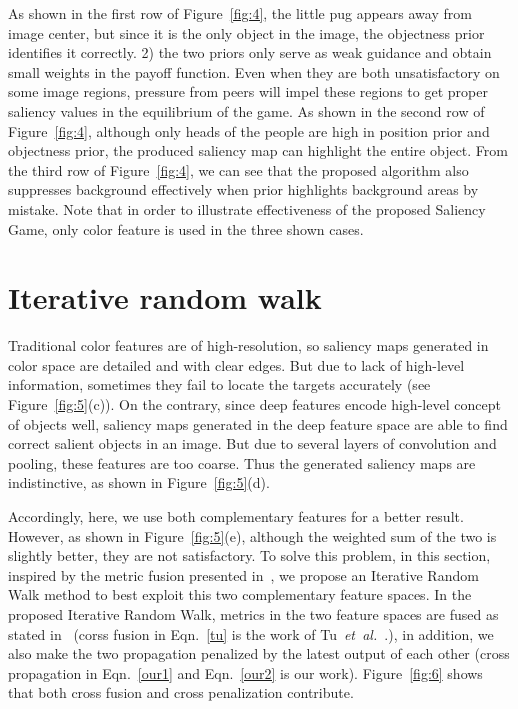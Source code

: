 \documentclass[journal]{IEEEtran}
\newcommand{\etal}{\mbox{\emph{et al.\ }}}
\begin{document}
As shown in the first row of Figure~\ref{fig:4}, the little pug appears away from image center, but since it is the only object in the image, the objectness prior identifies it correctly. 2) the two priors only serve as weak guidance and obtain small weights in the payoff function. Even when they are both unsatisfactory on some image regions, pressure from peers will impel these regions to get proper saliency values in the equilibrium of the game. As shown in the second row of Figure~\ref{fig:4}, although only heads of the people are high in position prior and objectness prior, the produced saliency map can highlight the entire object. From the third row of Figure~\ref{fig:4}, we can see that the proposed algorithm also suppresses background effectively when prior highlights background areas by mistake. Note that in order to illustrate effectiveness of the proposed Saliency Game, only color feature is used in the three shown cases.

\section{Iterative random walk}
Traditional color features are of high-resolution, so saliency maps generated in color space are detailed and with clear edges. But due to lack of high-level information, sometimes they fail to locate the targets accurately (see Figure~\ref{fig:5}(c)). On the contrary, since deep features encode high-level concept of objects well, saliency maps generated in the deep feature space are able to find correct salient objects in an image. But due to several layers of convolution and pooling, these features are too coarse. Thus the generated saliency maps are indistinctive, as shown in Figure~\ref{fig:5}(d).

Accordingly, here, we use both complementary features for a better result. However, as shown in Figure~\ref{fig:5}(e), although the weighted sum of the two is slightly better, they are not satisfactory. To solve this problem, in this section, inspired by the metric fusion presented in~\cite{Tu2012Unsupervised}, we propose an Iterative Random Walk method to best exploit this two complementary feature spaces. In the proposed Iterative Random Walk, metrics in the two feature spaces are fused as stated in~\cite{Tu2012Unsupervised} (corss fusion in Eqn.~\ref{tu} is the work of Tu~\etal.), in addition, we also make the two propagation penalized by the latest output of each other (cross propagation in Eqn.~\ref{our1} and Eqn.~\ref{our2} is  our work). Figure~\ref{fig:6} shows that both cross fusion and cross penalization contribute.
\end{document}

